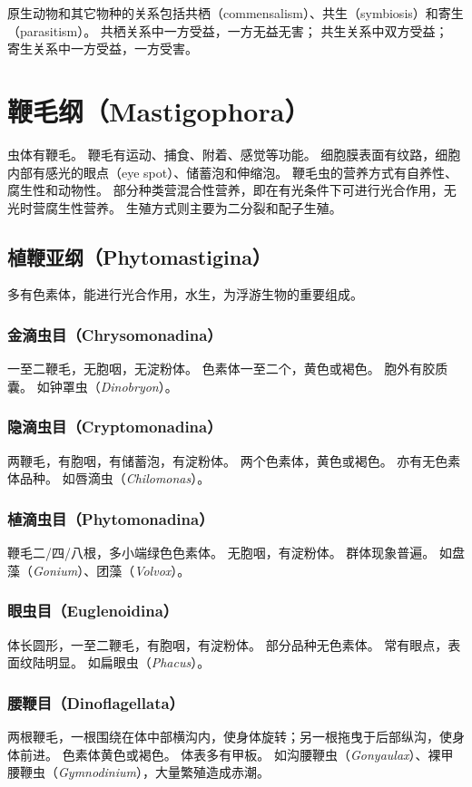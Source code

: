 \documentclass[11pt]{article}
\begin{document}
\newline

原生动物和其它物种的关系包括共栖（commensalism）、共生（symbiosis）和寄生（parasitism）。
共栖关系中一方受益，一方无益无害；
共生关系中双方受益；
寄生关系中一方受益，一方受害。

\section{鞭毛纲（Mastigophora）}
虫体有鞭毛。
鞭毛有运动、捕食、附着、感觉等功能。
细胞膜表面有纹路，细胞内部有感光的眼点（eye spot）、储蓄泡和伸缩泡。
鞭毛虫的营养方式有自养性、腐生性和动物性。
部分种类营混合性营养，即在有光条件下可进行光合作用，无光时营腐生性营养。
生殖方式则主要为二分裂和配子生殖。

\subsection{植鞭亚纲（Phytomastigina）}
多有色素体，能进行光合作用，水生，为浮游生物的重要组成。

\subsubsection{金滴虫目（Chrysomonadina）}
一至二鞭毛，无胞咽，无淀粉体。
色素体一至二个，黄色或褐色。
胞外有胶质囊。
如钟罩虫（\textit{Dinobryon}）。

\subsubsection{隐滴虫目（Cryptomonadina）}
两鞭毛，有胞咽，有储蓄泡，有淀粉体。
两个色素体，黄色或褐色。
亦有无色素体品种。
如唇滴虫（\textit{Chilomonas}）。

\subsubsection{植滴虫目（Phytomonadina）}
鞭毛二/四/八根，多小端绿色色素体。
无胞咽，有淀粉体。
群体现象普遍。
如盘藻（\textit{Gonium}）、团藻（\textit{Volvox}）。

\subsubsection{眼虫目（Euglenoidina）}
体长圆形，一至二鞭毛，有胞咽，有淀粉体。
部分品种无色素体。
常有眼点，表面纹陆明显。
如扁眼虫（\textit{Phacus}）。

\subsubsection{腰鞭目（Dinoflagellata）}
两根鞭毛，一根围绕在体中部横沟内，使身体旋转；另一根拖曳于后部纵沟，使身体前进。
色素体黄色或褐色。
体表多有甲板。
如沟腰鞭虫（\textit{Gonyaulax}）、裸甲腰鞭虫（\textit{Gymnodinium}），大量繁殖造成赤潮。
\end{document}

